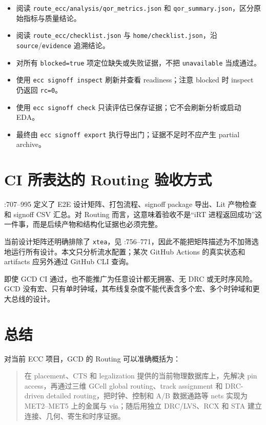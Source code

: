 \documentclass[UTF8,a4paper,11pt,fontset=fandol]{ctexart}
\newcommand{\code}[1]{\nolinkurl{#1}}
\begin{document}
\begin{itemize}[leftmargin=2em]
  \item[$\square$] 阅读 \code{route_ecc/analysis/qor_metrics.json} 和 \code{qor_summary.json}，区分原始指标与质量结论。
  \item[$\square$] 阅读 \code{route_ecc/checklist.json} 与 \code{home/checklist.json}，沿 \code{source}/\code{evidence} 追溯结论。
  \item[$\square$] 对所有 \code{blocked=true} 项定位缺失或失败证据，不把 \code{unavailable} 当成通过。
  \item[$\square$] 使用 \code{ecc signoff inspect} 刷新并查看 readiness；注意 blocked 时 inspect 仍返回 \code{rc=0}。
  \item[$\square$] 使用 \code{ecc signoff check} 只读评估已保存证据；它不会刷新分析或启动 EDA。
  \item[$\square$] 最终由 \code{ecc signoff export} 执行导出门；证据不足时不应产生 partial archive。
\end{itemize}

\section{CI 所表达的 Routing 验收方式}

:707--995 定义了 E2E 设计矩阵、打包流程、signoff package 导出、Lit 产物检查和 signoff CSV 汇总。对 Routing 而言，这意味着验收不是“iRT 进程返回成功”这一件事，而是后续产物和结构化证据也必须完整。

当前设计矩阵还明确排除了 \code{xtea}，见 :756--771，因此不能把矩阵描述为不加筛选地运行所有设计。本文只分析流水配置；某次 GitHub Actions 的真实状态和 artifacts 应另外通过 GitHub CLI 查询。

即使 GCD CI 通过，也不能推广为任意设计都无拥塞、无 DRC 或无时序风险。GCD 没有宏、只有单时钟域，其布线复杂度不能代表含多个宏、多个时钟域和更大总线的设计。

\section{总结}

对当前 ECC 项目，GCD 的 Routing 可以准确概括为：
\begin{quote}
在 placement、CTS 和 legalization 提供的当前物理数据库上，先解决 pin access，再通过三维 GCell global routing、track assignment 和 DRC-driven detailed routing，把时钟、控制和 A/B 数据通路等 nets 实现为 MET2--MET5 上的金属与 via；随后用独立 DRC/LVS、RCX 和 STA 建立连接、几何、寄生和时序证据。
\end{quote}
\end{document}
